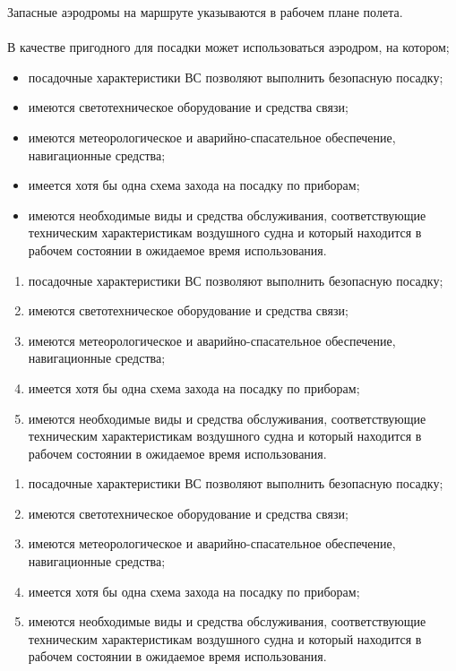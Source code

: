 Запасные аэродромы на маршруте указываются в рабочем плане полета.

\paragraph{} В качестве пригодного для посадки может использоваться аэродром, на котором;
\begin{itemize}
    \item посадочные характеристики ВС позволяют выполнить безопасную посадку;
    \item имеются светотехническое оборудование и средства связи;
    \item имеются метеорологическое и аварийно-спасательное обеспечение, навигационные средства;
    \item имеется хотя бы одна схема захода на посадку по приборам;
    \item имеются необходимые виды и средства обслуживания, соответствующие техническим характеристикам воздушного судна и который находится в рабочем состоянии в ожидаемое время использования.
\end{itemize}


\begin{enumerate}[label=\arabic*),ref=\arabic*]
    \item посадочные характеристики ВС позволяют выполнить безопасную посадку;
    \item имеются светотехническое оборудование и средства связи;
    \item имеются метеорологическое и аварийно-спасательное обеспечение, навигационные средства;
    \item имеется хотя бы одна схема захода на посадку по приборам;
    \item имеются необходимые виды и средства обслуживания, соответствующие техническим характеристикам воздушного судна и который находится в рабочем состоянии в ожидаемое время использования.
    
\end{enumerate}

\begin{enumerate}
    \item посадочные характеристики ВС позволяют выполнить безопасную посадку;
    \item имеются светотехническое оборудование и средства связи;
    \item имеются метеорологическое и аварийно-спасательное обеспечение, навигационные средства;
    \item имеется хотя бы одна схема захода на посадку по приборам;
    \item имеются необходимые виды и средства обслуживания, соответствующие техническим характеристикам воздушного судна и который находится в рабочем состоянии в ожидаемое время использования.    
\end{enumerate}


